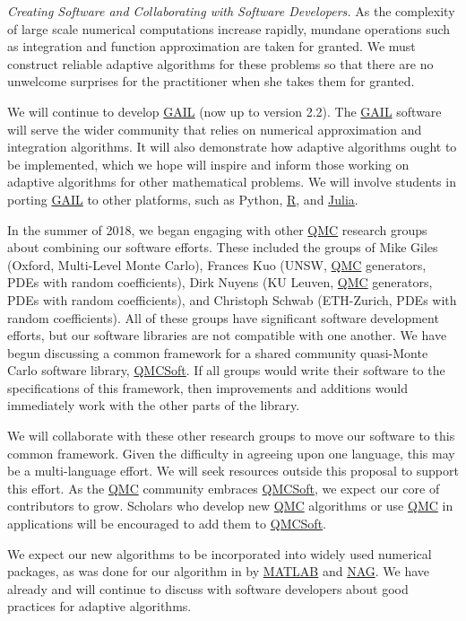 \documentclass[11pt]{NSFamsart}
\newcommand{\QMCSoft}{\hyperlink{QMCSoftlink}{QMCSoft}\xspace}
\newcommand{\GAIL}{\hyperlink{GAILlink}{GAIL}\xspace}
\newcommand{\QMC}{\hyperlink{QMClink}{QMC}\xspace}
\newcommand{\NAG}{\hyperlink{NAGlink}{NAG}\xspace}
\newcommand{\MATLAB}{\hyperlink{MATLABlink}{MATLAB}\xspace}
\newcommand{\Rlang}{\hyperlink{Rlink}{R}\xspace}
\newcommand{\Julia}{\hyperlink{Julialink}{Julia}\xspace}
\begin{document}
\emph{Creating Software and Collaborating with Software Developers.}
As the complexity of large scale numerical computations increase rapidly, mundane operations such as integration and function approximation are taken for granted. We must construct reliable adaptive algorithms for these problems so that there are no unwelcome surprises for the practitioner when she takes them for granted.

We will continue to develop \GAIL \citep{ChoEtal17b} (now up to version 2.2).  The \GAIL software 
will serve the wider community that relies on numerical approximation and integration algorithms.  It will 
also demonstrate how adaptive algorithms ought to be implemented, which we hope will inspire and 
inform those working on adaptive algorithms for other mathematical problems.  We will involve 
students in porting \GAIL to other platforms, such as Python, \Rlang, and \Julia.  

In the summer of 2018, we began engaging with other \QMC research groups about combining our software efforts.  These included the groups of Mike Giles (Oxford, Multi-Level Monte Carlo),  Frances Kuo (UNSW, \QMC generators, PDEs with random coefficients),  Dirk Nuyens (KU Leuven, \QMC generators, PDEs with random coefficients), and Christoph Schwab (ETH-Zurich, PDEs with random coefficients).  All of these groups have significant software development efforts, but our software libraries are not compatible with one another.  We have begun discussing a common framework for a shared community quasi-Monte Carlo software library, \QMCSoft.  If all groups would write their software to the specifications of this framework, then improvements and additions would immediately work with the other parts of the library.

We will collaborate with these other research groups to move our software to this common framework.  Given the difficulty in agreeing upon one language, this may be a multi-language effort.  We will seek resources outside this proposal to support this effort.  As the \QMC community embraces \QMCSoft, we expect our core of contributors to grow.  Scholars who develop new \QMC algorithms or use \QMC in applications will be encouraged to add them to \QMCSoft.  

We expect our new algorithms to be incorporated into widely used numerical packages, as was done for our algorithm in \cite{HonHic00a} by \MATLAB and \NAG.  We have already and will continue 
to discuss with software developers about good practices for adaptive algorithms.
\end{document}
